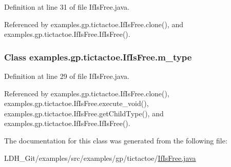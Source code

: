 Definition at line 31 of file If\-Is\-Free.\-java.



Referenced by examples.\-gp.\-tictactoe.\-If\-Is\-Free.\-clone(), and examples.\-gp.\-tictactoe.\-If\-Is\-Free.\-If\-Is\-Free().

\hypertarget{classexamples_1_1gp_1_1tictactoe_1_1_if_is_free_abc952d10b71af2ecc76aea823fa42f1a}{
\subsubsection[{m\-\_\-type}]{\setlength{\rightskip}{0pt plus 5cm}Class examples.\-gp.\-tictactoe.\-If\-Is\-Free.\-m\-\_\-type\hspace{0.3cm}{\ttfamily [private]}}}\label{classexamples_1_1gp_1_1tictactoe_1_1_if_is_free_abc952d10b71af2ecc76aea823fa42f1a}


Definition at line 29 of file If\-Is\-Free.\-java.



Referenced by examples.\-gp.\-tictactoe.\-If\-Is\-Free.\-clone(), examples.\-gp.\-tictactoe.\-If\-Is\-Free.\-execute\-\_\-void(), examples.\-gp.\-tictactoe.\-If\-Is\-Free.\-get\-Child\-Type(), and examples.\-gp.\-tictactoe.\-If\-Is\-Free.\-If\-Is\-Free().



The documentation for this class was generated from the following file\-:\begin{DoxyCompactItemize}
\item 
L\-D\-H\-\_\-\-Git/examples/src/examples/gp/tictactoe/\hyperlink{_if_is_free_8java}{If\-Is\-Free.\-java}\end{DoxyCompactItemize}
